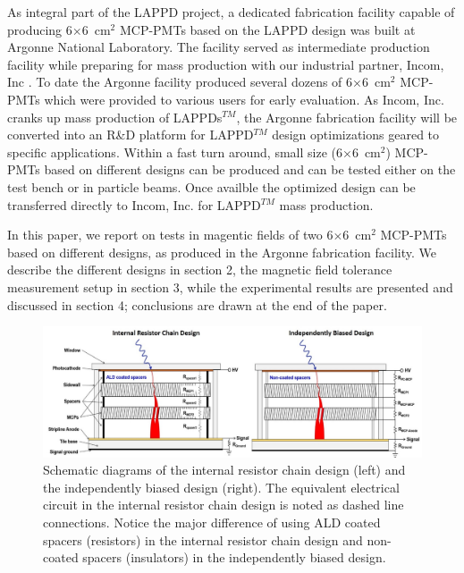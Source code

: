 \documentclass[preprint,5p]{elsarticle}
\begin{document}
As integral part of the LAPPD project, a dedicated fabrication facility 
\cite{15} capable of producing 6$\times$6~cm$^2$ MCP-PMTs based on the LAPPD design was 
built at Argonne National Laboratory.
The facility served as intermediate production facility while preparing for mass production with our
industrial partner, Incom, Inc \cite{16}. 
To date the Argonne facility produced several dozens of 6$\times$6~cm$^2$ MCP-PMTs which
were provided to various users for early evaluation.
As Incom, Inc.  cranks up mass production of LAPPDs$^{TM}$, the Argonne fabrication 
facility will be converted into an R\&D platform for LAPPD$^{TM}$ design
optimizations geared to specific applications. 
Within a fast turn around, small size (6$\times$6~cm$^2$) MCP-PMTs 
based on different designs can be produced and can be tested either on the test bench or in particle beams.
Once availble the optimized design can be transferred directly to 
Incom, Inc. for LAPPD$^{TM}$ mass production. 

In this paper, we report on tests in magentic fields of two 6$\times$6~cm$^2$ MCP-PMTs based on 
different designs, as produced in the Argonne fabrication facility.
We describe the different designs in section 2, the magnetic field tolerance measurement 
setup in section 3, while the experimental results are presented and discussed in 
section 4; conclusions are drawn at the end of the paper.



\begin{figure}[tbp]
\centering \includegraphics[scale=1.1]{fig/Figure1.jpg}
\caption{Schematic diagrams of the internal resistor chain design (left) and 
   the independently biased design (right). The equivalent electrical circuit 
   in the internal resistor chain design is noted as dashed line connections.  
   Notice the major difference of using ALD coated spacers (resistors) in the 
   internal resistor chain design and non-coated spacers (insulators) in the
   independently biased design.} \label{fig:design}
\end{figure}
\end{document}
